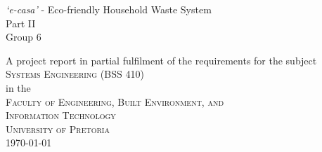 \thispagestyle{empty}
\begin{center}
{\huge \textit{`e-casa'} - Eco-friendly Household Waste System\\Part II}
\vspace{20mm} \\
{\Large Group 6}
\vfill

A project report in partial fulfilment of the requirements for the subject\\
\vspace{10mm}
{\Large \textsc{Systems Engineering (BSS 410)}} \\
\vfill
%
in the \\
\vspace{20mm}
%
{\Large \textsc{Faculty of Engineering, Built Environment, and \\ 
Information Technology}}\\
%
\vspace{10mm}
{\Large\textsc{University of Pretoria}} \\
%
\vfill
%
\today
\end{center}
